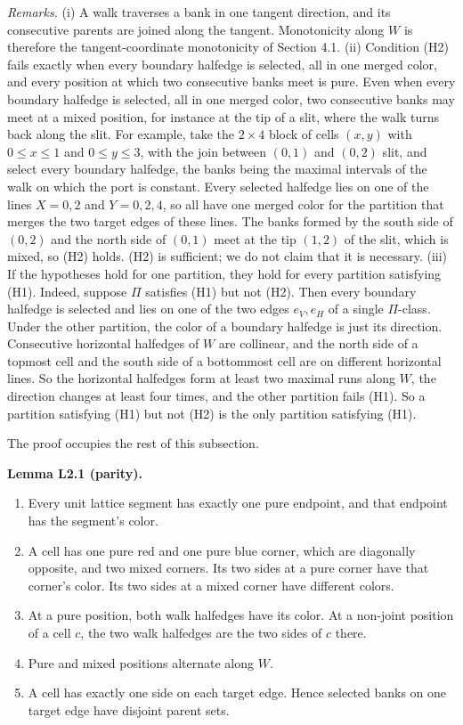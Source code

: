 \documentclass[
  11pt,
]{article}
\providecommand{\tightlist}{%
  \setlength{\itemsep}{0pt}\setlength{\parskip}{0pt}}
\begin{document}
\emph{Remarks.} (i) A walk traverses a bank in one tangent direction,
and its consecutive parents are joined along the tangent. Monotonicity
along \(W\) is therefore the tangent-coordinate monotonicity of Section
4.1. (ii) Condition (H2) fails exactly when every boundary halfedge is
selected, all in one merged color, and every position at which two
consecutive banks meet is pure. Even when every boundary halfedge is
selected, all in one merged color, two consecutive banks may meet at a
mixed position, for instance at the tip of a slit, where the walk turns
back along the slit. For example, take the \(2\times4\) block of cells
\((x,y)\) with \(0\le x\le1\) and \(0\le y\le3\), with the join between
\((0,1)\) and \((0,2)\) slit, and select every boundary halfedge, the
banks being the maximal intervals of the walk on which the port is
constant. Every selected halfedge lies on one of the lines \(X=0,2\) and
\(Y=0,2,4\), so all have one merged color for the partition that merges
the two target edges of these lines. The banks formed by the south side
of \((0,2)\) and the north side of \((0,1)\) meet at the tip \((1,2)\)
of the slit, which is mixed, so (H2) holds. (H2) is sufficient; we do
not claim that it is necessary. (iii) If the hypotheses hold for one
partition, they hold for every partition satisfying (H1). Indeed,
suppose \(\Pi\) satisfies (H1) but not (H2). Then every boundary
halfedge is selected and lies on one of the two edges \(e_V,e_H\) of a
single \(\Pi\)-class. Under the other partition, the color of a boundary
halfedge is just its direction. Consecutive horizontal halfedges of
\(W\) are collinear, and the north side of a topmost cell and the south
side of a bottommost cell are on different horizontal lines. So the
horizontal halfedges form at least two maximal runs along \(W\), the
direction changes at least four times, and the other partition fails
(H1). So a partition satisfying (H1) but not (H2) is the only partition
satisfying (H1).

The proof occupies the rest of this subsection.

\textbf{Lemma L2.1 (parity).}

\begin{enumerate}
\def\labelenumi{\arabic{enumi}.}
\tightlist
\item
  Every unit lattice segment has exactly one pure endpoint, and that
  endpoint has the segment's color.
\item
  A cell has one pure red and one pure blue corner, which are diagonally
  opposite, and two mixed corners. Its two sides at a pure corner have
  that corner's color. Its two sides at a mixed corner have different
  colors.
\item
  At a pure position, both walk halfedges have its color. At a non-joint
  position of a cell \(c\), the two walk halfedges are the two sides of
  \(c\) there.
\item
  Pure and mixed positions alternate along \(W\).
\item
  A cell has exactly one side on each target edge. Hence selected banks
  on one target edge have disjoint parent sets.
\end{enumerate}
\end{document}
